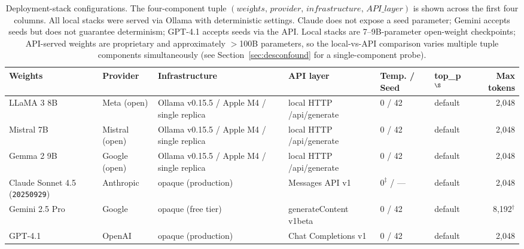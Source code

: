 \documentclass[preprint,review,12pt,authoryear]{elsarticle}
\begin{document}
\begin{table}[htbp]
\centering
\caption{Deployment-stack configurations. The four-component tuple $(\textit{weights},\,\textit{provider},\,\textit{infrastructure},\,\textit{API\_layer})$ is shown across the first four columns. All local stacks were served via Ollama with deterministic settings. Claude does not expose a seed parameter; Gemini accepts seeds but does not guarantee determinism; GPT-4.1 accepts seeds via the API. Local stacks are 7--9B-parameter open-weight checkpoints; API-served weights are proprietary and approximately $>$100B parameters, so the local-vs-API comparison varies multiple tuple components simultaneously (see Section~\ref{sec:desconfound} for a single-component probe).}
\label{tab:models}
\footnotesize
\setlength{\tabcolsep}{3pt}
\begin{tabular}{P{2.0cm}P{1.5cm}P{2.3cm}P{2.0cm}P{1.1cm}P{1.2cm}r}
\toprule
\textbf{Weights} & \textbf{Provider} & \textbf{Infra\-structure} & \textbf{API layer} & \textbf{Temp.} / \textbf{Seed} & \textbf{top\_p}$^{\S}$ & \textbf{Max tokens} \\
\midrule
LLaMA 3 8B  & Meta (open) & Ollama v0.15.5 / Apple M4 / single replica & local HTTP /api/\allowbreak generate & 0 / 42 & default & 2{,}048 \\
Mistral 7B  & Mistral (open) & Ollama v0.15.5 / Apple M4 / single replica & local HTTP /api/\allowbreak generate & 0 / 42 & default & 2{,}048 \\
Gemma 2 9B  & Google (open) & Ollama v0.15.5 / Apple M4 / single replica & local HTTP /api/\allowbreak generate & 0 / 42 & default & 2{,}048 \\
\midrule
Claude Sonnet 4.5 (\texttt{20250929}) & Anthropic & opaque (production) & Messages API v1 & $0^{\ddagger}$ / --- & default & 2{,}048 \\
Gemini 2.5 Pro & Google & opaque (free tier) & generate\-Content v1beta & 0 / 42 & default & 8{,}192$^{\dagger}$ \\
GPT-4.1 & OpenAI & opaque (production) & Chat Completions v1 & 0 / 42 & default & 2{,}048 \\
\bottomrule
\end{tabular}
\par{}
\end{table}
\end{document}
